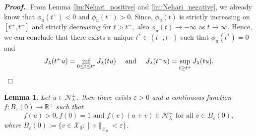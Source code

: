 \documentclass[11pt]{article}
\newtheorem{lemma}{Lemma}[section] %
\newcommand{\R}{\mathbb{R}}
\newcommand{\X}{\mathcal{X}_{0}}
\newcommand{\la} {\lambda}
\newcommand{\ds} {\displaystyle}
\newcommand{\ra} {\rightarrow}
\begin{document}
\begin{proof}[\bf Proof.]
From Lemma \ref{lm:Nehari_positive} and 
\ref{lm:Nehari_negative}, 
we already know that $\phi_u(t^+)<0$
and $\phi_u(t^-)>0.$
Since, $\phi_u(t)$
is strictly increasing on $[t^+,t^-]$
and strictly decreasing for $t>t^-,$
also $\phi_u(t)\to-\infty$
as $t\to\infty.$
Hence, we can conclude that there exists 
a unique $t^*\in (t^+,t^-)$
such that $\phi_u(t^*)=0$
and 
\begin{equation*}
J_\la(t^+u)=\ds\inf_{0\le t\le t^*}J_\la(tu)
 \quad\text{ and }\quad 
J_\la(t^-u)=\ds\sup_{t\ge t^+}J_\la(tu).
\qedhere
\end{equation*}
\end{proof}

\begin{lemma}\label{lm9}
    Let $u\in \mathcal{N}_\la^\pm,$
then there exists $\varepsilon>0$
and a continuous function 
$f:B_\varepsilon(0)\ra \R^+$
such that
$$
    f(u)>0, f(0)=1 \text{ and } 
    f(v)(u+v)\in \mathcal{N}_\la^\pm 
    \text{ for all } v\in B_\varepsilon(0),
$$
    where $B_\varepsilon(0):=
    \{v\in \X:\|v\|_{\X}<\varepsilon\}.$
\end{lemma}
\end{document}
